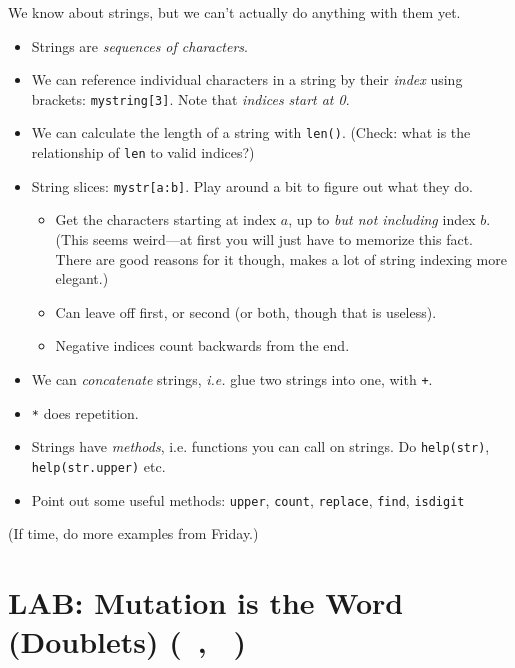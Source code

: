 \documentclass{article}
\newcommand{\shortmonthname}{\StrLeft{\datemonthname}{3}}
\newcommand{\showdate}{\thedateday\ \shortmonthname}
\newcommand{\lab}[1]{\section*{LAB: #1 (\showdate\nextdate, \showdate)}}
\begin{document}
We know about strings, but we can't actually do anything with them yet.
\begin{itemize}
\item Strings are \emph{sequences of characters}.

\item We can reference individual characters in a string by their
  \emph{index} using brackets: \verb|mystring[3]|.  Note that
  \emph{indices start at 0}.

\item We can calculate the length of a string with \verb|len()|.
  (Check: what is the relationship of \verb|len| to valid indices?)

\item String slices: \verb|mystr[a:b]|.  Play around a bit to figure
  out what they do.
  \begin{itemize}
  \item Get the characters starting at index $a$, up to \emph{but not
      including} index $b$.  (This seems weird---at first you will just
    have to memorize this fact.  There are good reasons for it though,
    makes a lot of string indexing more elegant.)
  \item Can leave off first, or second (or both, though that is
    useless).
  \item Negative indices count backwards from the end.
  \end{itemize}

\item We can \emph{concatenate} strings, \emph{i.e.} glue two strings
  into one, with \verb|+|.

\item \verb|*| does repetition.

\item Strings have \emph{methods}, i.e. functions you can call on
  strings.  Do \verb|help(str)|, \verb|help(str.upper)| etc.

\item Point out some useful methods: \verb|upper|, \verb|count|,
  \verb|replace|, \verb|find|, \verb|isdigit|

\end{itemize}

(If time, do more examples from Friday.)

\newpage
\lab{Mutation is the Word (Doublets)}
\end{document}
